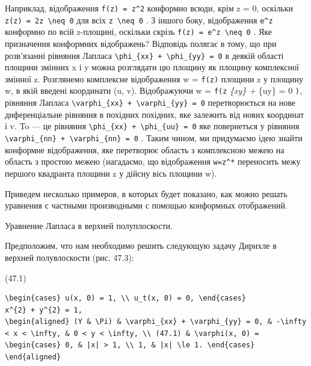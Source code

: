 \documentclass[
  ukrainian,
]{article}
\begin{document}
Наприклад, відображення \texttt{f(z)\ =\ z\^{}2} конформно всюди, крім z
= 0, оскільки
\texttt{z\textquotesingle{}(z)\ =\ 2z\ \textbackslash{}neq\ 0} для всіх
\texttt{z\ \textbackslash{}neq\ 0} . З іншого боку, відображення
\texttt{e\^{}z} конформно по всій z-площині, оскільки скрізь
\texttt{f\textquotesingle{}(z)\ =\ e\^{}z\ \textbackslash{}neq\ 0} . Яке
призначення конформних відображень? Відповідь полягає в тому, що при
розв'язанні рівняння Лапласа
\texttt{\textbackslash{}phi\_\{xx\}\ +\ \textbackslash{}phi\_\{yy\}\ =\ 0}
в деякій області площини змінних x і y можна розглядати цю площину як
площину комплексної змінної z. Розглянемо комплексне відображення w =
\texttt{f(z)} площини z у площину w, в якій введені координати (u, v).
Відображуючи w = \texttt{f(z} \phi\emph{\{xy\} + \phi}\{uy\} = 0
\texttt{)}, рівняння Лапласа
\texttt{\textbackslash{}varphi\_\{xx\}\ +\ \textbackslash{}varphi\_\{yy\}\ =\ 0}
перетворюється на нове диференціальне рівняння в похідних похідних, яке
залежить від нових координат і v. To --- це рівняння
\texttt{\textbackslash{}phi\_\{xx\}\ +\ \textbackslash{}phi\_\{uu\}\ =\ 0}
яке повернеться у рівняння
\texttt{\textbackslash{}varphi\_\{nn\}\ +\ \textbackslash{}varphi\_\{nn\}\ =\ 0}
. Таким чином, ми придумаємо ідею знайти конформне відображення, яке
перетворює область з комплексною межею на область з простою межею
(нагадаємо, що відображення \texttt{w=z\^{}*} переносить межу першого
квадранта площини z у дійсну вісь площини w).

Приведем несколько примеров, в которых будет показано, как можно решать
уравнения с частными производными с помощью конформных отображений.

Уравнение Лапласа в верхней полуплоскости.

Предположим, что нам необходимо решить следующую задачу Дирихле в
верхней полувлоскости (рис. 47.3):

(47.1)

\begin{verbatim}
\begin{cases} u(x, 0) = 1, \\ u_t(x, 0) = 0, \end{cases}
x^{2} + y^{2} = 1,
\begin{aligned} (Y & \Pi) & \varphi_{xx} + \varphi_{yy} = 0, & -\infty < x < \infty, & 0 < y < \infty, \\ (47.1) & \varphi(x, 0) = \begin{cases} 0, & |x| > 1, \\ 1, & |x| \le 1. \end{cases} \end{aligned}
\end{verbatim}
\end{document}
